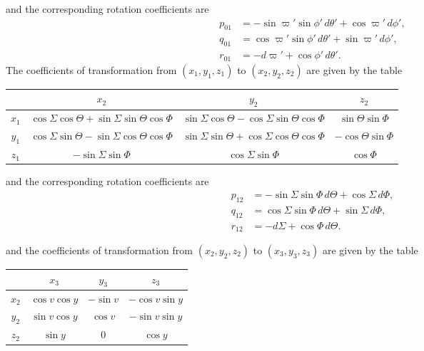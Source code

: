 \documentclass[12pt,a4paper]{article}
\theoremstyle{plain}
\begin{document}
\noindent and the corresponding rotation coefficients are
\begin{align*}
p_{01} &= -\sin\varpi'\sin\phi'\,d\theta'+\cos\varpi'\,d\phi',\\
q_{01} &= \cos\varpi'\sin\phi'\,d\theta'+\sin\varpi'\,d\phi',\\
r_{01} &= -d\varpi'+\cos\phi'\,d\theta'.
\end{align*}
The coefficients of transformation from $(x_{1},y_{1},z_{1})$ to $(x_{2},y_{2},z_{2})$ are given by the table

\begin{center}
\small
\begin{tabular}{|c|c|c|c|}
\hline
       & $x_{2}$ & $y_{2}$ & $z_{2}$ \\
\hline
$x_{1}$ & $\cos\varSigma\cos\Theta+\sin\varSigma\sin\Theta\cos\varPhi$ & $\sin\varSigma\cos\Theta-\cos\varSigma\sin\Theta\cos\varPhi$ & $\sin\Theta\sin\varPhi$ \\
$y_{1}$ & $\cos\varSigma\sin\Theta-\sin\varSigma\cos\Theta\cos\varPhi$ & $\sin\varSigma\sin\Theta+\cos\varSigma\cos\Theta\cos\varPhi$ & $-\cos\Theta\sin\varPhi$ \\
$z_{1}$ & $-\sin\varSigma\sin\varPhi$ & $\cos\varSigma\sin\varPhi$ & $\cos\varPhi$ \\
\hline
\end{tabular}
\end{center}

\noindent and the corresponding rotation coefficients are
\begin{align*}
p_{12} &= -\sin\varSigma\sin\varPhi\,d\Theta+\cos\varSigma\,d\varPhi,\\
q_{12} &= \cos\varSigma\sin\varPhi\,d\Theta+\sin\varSigma\,d\varPhi,\\
r_{12} &= -d\varSigma+\cos\varPhi\,d\Theta.
\end{align*}

\newpage
{} and the coefficients of transformation from $(x_{2},y_{2},z_{2})$ to $(x_{3},y_{3},z_{3})$ are given by the table

\begin{center}
\small
\begin{tabular}{|c|c|c|c|}
\hline
       & $x_{3}$ & $y_{3}$ & $z_{3}$ \\
\hline
$x_{2}$ & $\cos v\cos y$ & $-\sin v$ & $-\cos v\sin y$ \\
$y_{2}$ & $\sin v\cos y$ & $\cos v$ & $-\sin v\sin y$ \\
$z_{2}$ & $\sin y$ & $0$ & $\cos y$ \\
\hline
\end{tabular}
\end{center}
\end{document}
